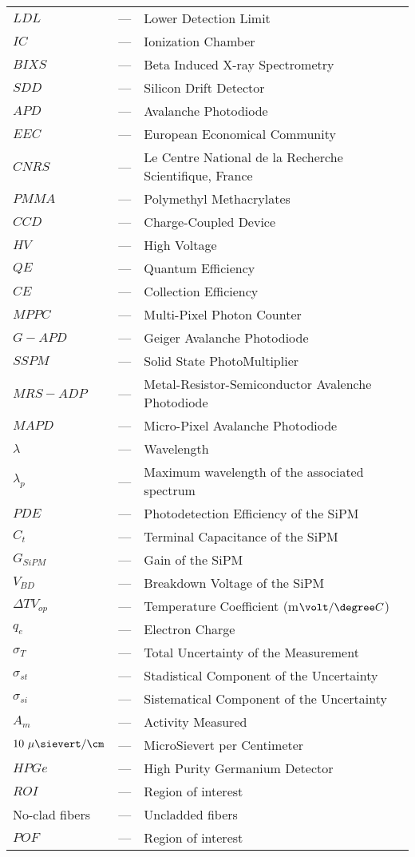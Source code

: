 \begin{longtable}{p{25mm} c p{120mm} }
$LDL$ & --- & Lower Detection Limit\\
$IC$ & --- & Ionization Chamber\\
$BIXS$ & --- & Beta Induced X-ray Spectrometry\\
$SDD$ & --- & Silicon Drift Detector\\
$APD$ & --- & Avalanche Photodiode\\
$EEC$ & --- & European Economical Community\\
$CNRS$ & --- & Le Centre National de la Recherche Scientifique, France\\
$PMMA$ & --- & Polymethyl Methacrylates\\
$CCD$ & --- & Charge-Coupled Device\\
$HV$ & --- & High Voltage\\
$QE$ & --- & Quantum Efficiency\\
$CE$ & --- & Collection Efficiency\\
$MPPC$ & --- & Multi-Pixel Photon Counter\\
$G-APD$ & --- & Geiger Avalanche Photodiode\\
$SSPM$ & --- & Solid State PhotoMultiplier\\
$MRS-ADP$ & --- & Metal-Resistor-Semiconductor Avalenche Photodiode\\
$MAPD$ & --- & Micro-Pixel Avalanche Photodiode\\
$\lambda$ & --- & Wavelength\\
$\lambda_p$ & --- & Maximum wavelength of the
\newline associated spectrum\\
$PDE$ & --- & Photodetection Efficiency of the SiPM\\
$C_t$ & --- & Terminal Capacitance of the SiPM\\
$G_{SiPM}$ & --- & Gain of the SiPM\\
$V_{BD}$ & --- & Breakdown Voltage of the SiPM\\
$\Delta TV_{op}$ & --- & Temperature Coefficient (m$\volt/\degree C$)\\
$q_{e}$ & --- & Electron Charge\\
$\sigma_{T}$ & --- & Total Uncertainty of the Measurement\\
$\sigma_{st}$ & --- & Stadistical Component of the Uncertainty\\
$\sigma_{si}$ & --- & Sistematical Component of the Uncertainty\\
$A_{m}$ & --- & Activity Measured\\
$10~\mu\sievert/\cm$ & --- & MicroSievert per Centimeter\\
$HPGe$ & --- & High Purity Germanium Detector\\
$ROI$ & --- & Region of interest\\
No-clad fibers & --- & Uncladded fibers\\
$POF$ & --- & Region of interest\\



\end{longtable}

